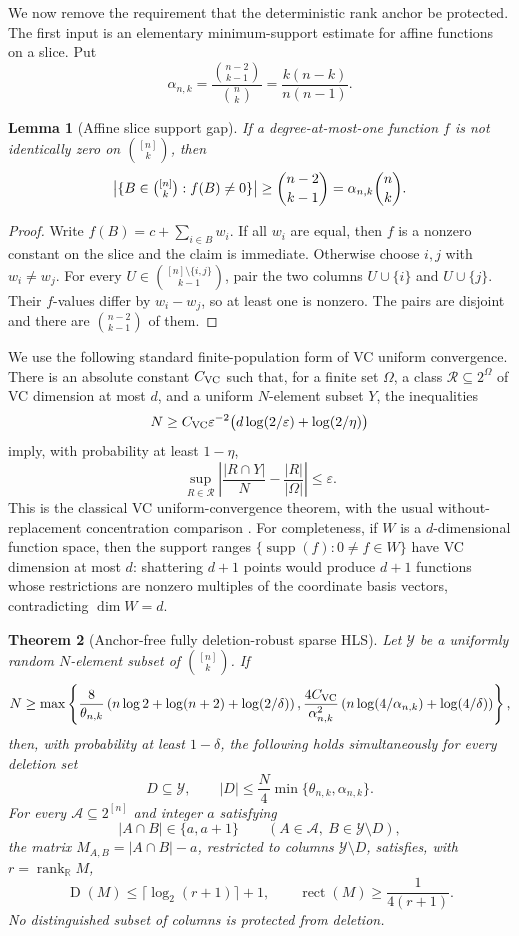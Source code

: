 \documentclass[11pt]{article}
\newtheorem{theorem}{Theorem}[section]
\newtheorem{lemma}[theorem]{Lemma}
\theoremstyle{definition}
\theoremstyle{remark}
\newcommand{\cA}{\mathcal A}
\newcommand{\cY}{\mathcal Y}
\newcommand{\R}{\mathbb R}
\newcommand{\1}{\mathbf 1}
\newcommand{\rank}{\operatorname{rank}}
\newcommand{\rect}{\operatorname{rect}}
\newcommand{\Dcc}{\operatorname{D}}
\begin{document}
We now remove the requirement that the deterministic rank anchor be
protected.  The first input is an elementary minimum-support estimate for
affine functions on a slice.  Put
\[
 \alpha_{n,k}=\frac{\binom{n-2}{k-1}}{\binom nk}
 =\frac{k(n-k)}{n(n-1)}.
\]

\begin{lemma}[Affine slice support gap]
\label{lem:affine-slice-support-gap}
If a degree-at-most-one function $f$ is not identically zero on
$\binom{[n]}k$, then
\[
 \bigl|\{B\in\tbinom{[n]}k:f(B)\ne0\}\bigr|
 \ge\binom{n-2}{k-1}
 =\alpha_{n,k}\binom nk.
\]
\end{lemma}

\begin{proof}
Write $f(B)=c+\sum_{i\in B}w_i$.  If all $w_i$ are equal, then $f$ is a
nonzero constant on the slice and the claim is immediate.  Otherwise choose
$i,j$ with $w_i\ne w_j$.  For every
$U\in\binom{[n]\setminus\{i,j\}}{k-1}$, pair the two columns
$U\cup\{i\}$ and $U\cup\{j\}$.  Their $f$-values differ by $w_i-w_j$, so at
least one is nonzero.  The pairs are disjoint and there are
$\binom{n-2}{k-1}$ of them.
\end{proof}

We use the following standard finite-population form of VC uniform
convergence.  There is an absolute constant $C_{\rm VC}$ such that, for a
finite set $\Omega$, a class $\mathcal R\subseteq2^\Omega$ of VC dimension at
most $d$, and a uniform $N$-element subset $Y$, the inequalities
\[
 N\ge C_{\rm VC}\varepsilon^{-2}
       \bigl(d\log(2/\varepsilon)+\log(2/\eta)\bigr)
\]
imply, with probability at least $1-\eta$,
\[
 \sup_{R\in\mathcal R}
 \left|\frac{|R\cap Y|}{N}-\frac{|R|}{|\Omega|}\right|
 \le\varepsilon.
\]
This is the classical VC uniform-convergence theorem, with the usual
without-replacement concentration comparison
\cite{VapnikChervonenkis,BardenetMaillard}.  For completeness, if $W$ is a
$d$-dimensional function space, then the support ranges
$\{\operatorname{supp}(f):0\ne f\in W\}$ have VC dimension at most $d$:
shattering $d+1$ points would produce $d+1$ functions whose restrictions are
nonzero multiples of the coordinate basis vectors, contradicting
$\dim W=d$.

\begin{theorem}[Anchor-free fully deletion-robust sparse HLS]
\label{thm:anchor-free-robust-sparse-hls}
Let $\cY$ be a uniformly random $N$-element subset of
$\binom{[n]}k$.  If
\[
 N\ge\max\left\{
 \frac8{\theta_{n,k}}
 \left(n\log2+\log(n+2)+\log(2/\delta)\right),
 \frac{4C_{\rm VC}}{\alpha_{n,k}^2}
 \left(n\log(4/\alpha_{n,k})+\log(4/\delta)\right)
 \right\},
\]
then, with probability at least $1-\delta$, the following holds
simultaneously for every deletion set
\[
 D\subseteq\cY,
 \qquad |D|\le\frac{N}{4}
 \min\{\theta_{n,k},\alpha_{n,k}\}.
\]
For every $\cA\subseteq2^{[n]}$ and integer $a$ satisfying
\[
 |A\cap B|\in\{a,a+1\}
 \qquad(A\in\cA,\ B\in\cY\setminus D),
\]
the matrix $M_{A,B}=|A\cap B|-a$, restricted to columns
$\cY\setminus D$, satisfies, with $r=\rank_{\R}M$,
\[
 \Dcc(M)\le\lceil\log_2(r+1)\rceil+1,
 \qquad
 \rect(M)\ge\frac1{4(r+1)}.
\]
No distinguished subset of columns is protected from deletion.
\end{theorem}
\end{document}
